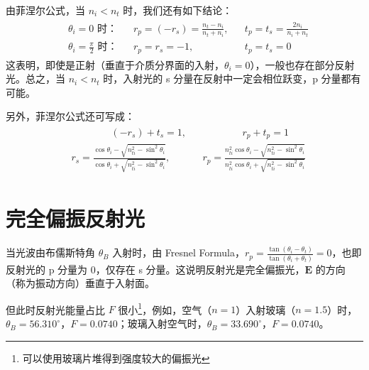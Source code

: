 \documentclass[UTF8]{report}
\theoremstyle{MyLineTheoremStyle} %
\theoremstyle{MyBlockTheoremStyle} %
\theoremstyle{MySubsubsectionStyle} %
\begin{document}
由菲涅尔公式，当 $n_i < n_t$ 时，我们还有如下结论：
\begin{gather}
    \begin{aligned}
        &\text{$\theta_i = 0$ 时：} &&r_p = (-r_s)  = \frac{n_t - n_i}{n_t + n_i}, &&t_p = t_s = \frac{2n_i}{n_i + n_t} \\ 
        &\text{$\theta_i = \frac{\pi}{2}$ 时：} &&r_p = r_s  = -1,&&t_p = t_s  =0
    \end{aligned}
\end{gather}
这表明，即使是正射（垂直于介质分界面的入射，$\theta_i = 0$），一般也存在部分反射光。总之，当 $n_i < n_t$ 时，入射光的 s 分量在反射中一定会相位跃变，p 分量都有可能。

另外，菲涅尔公式还可写成：
\begin{gather}
\boxed{
\begin{aligned}
    &\quad\quad \quad \quad   (-r_s) + t_s  = 1, &&\quad 
    \quad \quad\quad   r_p + t_p = 1 
    \\ 
    &r_s = \frac{\cos \theta_i - \sqrt{n_{ti}^2 - \sin^2 \theta_i} }{\cos \theta_i + \sqrt{n_{ti}^2 - \sin^2 \theta_i}}, && r_p = \frac{n_{ti}^2\cos \theta_i - \sqrt{n_{ti}^2 - \sin^2 \theta_i} }{n_{ti}^2\cos \theta_i + \sqrt{n_{ti}^2 - \sin^2 \theta_i}}
\end{aligned}
}
\end{gather}

\section{完全偏振反射光}

当光波由布儒斯特角 $\theta_B$ 入射时，由 Fresnel Formula，$r_p = \frac{\tan (\theta_i - \theta_t)}{\tan (\theta_i + \theta_t)} = 0$，也即反射光的 p 分量为 0，仅存在 s 分量。这说明反射光是完全偏振光，$\boldsymbol{E}$ 的方向（称为振动方向）垂直于入射面。
{\par\color{gray}\small
但此时反射光能量占比 $F$ 很小\footnote{可以使用玻璃片堆得到强度较大的偏振光}，例如，空气（$n=1$）入射玻璃（$n = 1.5$）时，$\theta_B = 56.310^\circ$，$F =0.0740 $；玻璃入射空气时，$\theta_B = 33.690^\circ$，$F =0.0740 $。
\par}

\end{document}
